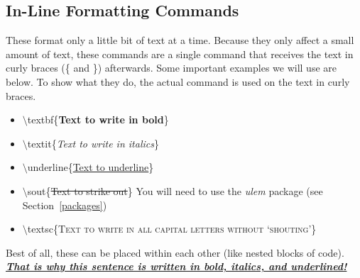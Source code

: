 \documentclass[10pt]{article}
\begin{document}
\subsection{In-Line Formatting Commands\label{inlineFormatCmds}}
These format only a little bit of text at a time.  Because they only affect a small amount of text, these commands are a single command that receives the text in curly braces (\{ and \}) afterwards.  Some important examples we will use are below.  To show what they do, the actual command is used on the text in curly braces.
\begin{itemize}
\item $ \setminus $textbf\{\textbf{Text to write in bold}\}
\item $ \setminus $textit\{\textit{Text to write in italics}\}
\item $ \setminus $underline\{\underline{Text to underline}\}
\item $ \setminus $sout\{\sout{Text to strike out}\} You will need to use the \textit{ulem} package (see Section~\ref{packages})
\item $ \setminus $textsc\{\textsc{Text to write in all capital letters without `shouting'}\}
\end{itemize}
Best of all, these can be placed within each other (like nested blocks of code).  \textbf{\textit{\underline{That is why this sentence is written in bold, italics, and underlined!}}}
\end{document}
